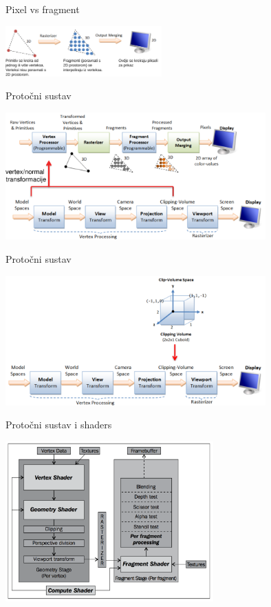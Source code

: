 \documentclass[9pt]{beamer}
\begin{document}
\begin{frame}{Pixel vs fragment}
	\begin{center}
		\includegraphics[width=6cm]{./slike/graphics_pipeline_02.png}
	\end{center}
\end{frame}

\begin{frame}{Protočni sustav}
	\begin{center}
		\includegraphics[width=10cm]{./slike/graphics_pipeline_03.png}
	\end{center}
\end{frame}

\begin{frame}{Protočni sustav}
	\begin{center}
		\includegraphics[width=10cm]{./slike/graphics_pipeline_04.png}
	\end{center}
\end{frame}

\begin{frame}{Protočni sustav i shaders}
	\begin{center}
		\includegraphics[width=8cm]{./slike/graphics_pipeline_05.png}
	\end{center}
\end{frame}
\end{document}
